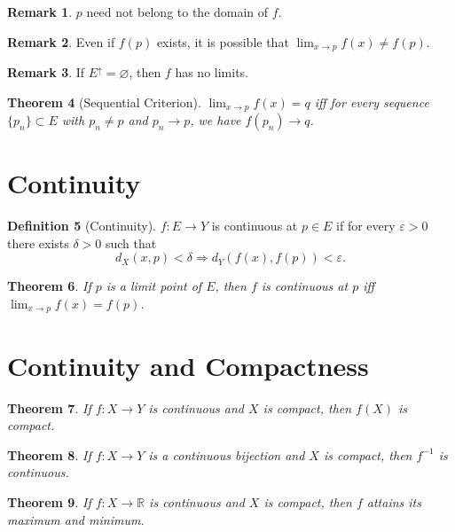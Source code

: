 \documentclass[11pt]{book}
\theoremstyle{definition}
\newtheorem{definition}{Definition}[chapter]
\newtheorem{remark}[definition]{Remark}
\theoremstyle{plain}
\newtheorem{theorem}[definition]{Theorem}
\newcommand{\R}{\mathbb{R}}
\begin{document}
\begin{remark}
$p$ need not belong to the domain of $f$.
\end{remark}

\begin{remark}
Even if $f(p)$ exists, it is possible that $\lim_{x\to p} f(x)\ne f(p)$.
\end{remark}

\begin{remark}
If $E^\uparrow=\varnothing$, then $f$ has no limits.
\end{remark}

\begin{theorem}[Sequential Criterion]
$\lim_{x\to p} f(x)=q$ iff for every sequence $\{p_n\}\subset E$ with
$p_n\ne p$ and $p_n\to p$, we have $f(p_n)\to q$.
\end{theorem}

\section{Continuity}

\begin{definition}[Continuity]
$f:E\to Y$ is continuous at $p\in E$ if for every $\varepsilon>0$
there exists $\delta>0$ such that
\[
d_X(x,p)<\delta \Rightarrow d_Y(f(x),f(p))<\varepsilon.
\]
\end{definition}

\begin{theorem}
If $p$ is a limit point of $E$, then $f$ is continuous at $p$
iff $\lim_{x\to p} f(x)=f(p)$.
\end{theorem}

\section{Continuity and Compactness}

\begin{theorem}
If $f:X\to Y$ is continuous and $X$ is compact, then $f(X)$ is compact.
\end{theorem}

\begin{theorem}
If $f:X\to Y$ is a continuous bijection and $X$ is compact,
then $f^{-1}$ is continuous.
\end{theorem}

\begin{theorem}
If $f:X\to\R$ is continuous and $X$ is compact, then $f$ attains
its maximum and minimum.
\end{theorem}
\end{document}
